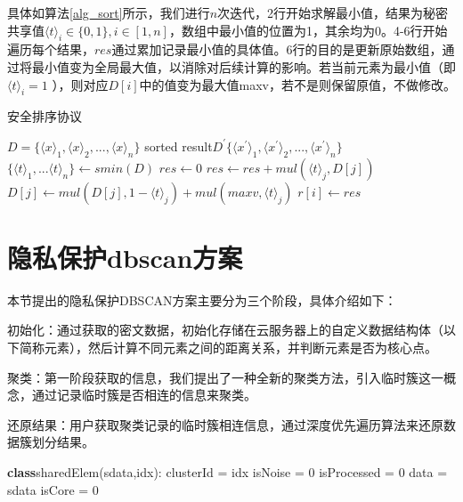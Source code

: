 具体如算法\ref{alg_sort}所示，我们进行$ n $次迭代，2行开始求解最小值，结果为秘密共享值$ \langle t \rangle_i \in \{0,1\}, i\in[1,n] $，数组中最小值的位置为1，其余均为0。4-6行开始遍历每个结果，$ res $通过累加记录最小值的具体值。6行的目的是更新原始数组，通过将最小值变为全局最大值，以消除对后续计算的影响。若当前元素为最小值（即$\langle t \rangle_i=1  $ ），则对应$ D[i] $中的值变为最大值maxv，若不是则保留原值，不做修改。
\begin{algorithm}[htbp]
	\renewcommand{\algorithmicrequire}{\textbf{输入:}}
	\renewcommand{\algorithmicensure}{\textbf{输出:}}
	\caption{安全排序协议}
	\label{alg_sort}
	\begin{algorithmic}[1]
		\REQUIRE $ D = \{\langle x\rangle_1, \langle x\rangle_2,...,\langle x\rangle_n\} $
		\ENSURE sorted result$ D^{\prime}\{\langle x^{\prime}\rangle_1, \langle x^{\prime}\rangle_2,...,\langle x^{\prime}\rangle_n\} $
		\STATE $ \{\langle t\rangle_1,...\langle t \rangle_n\} \leftarrow smin(D)$
		\STATE $ res \leftarrow 0 $
		\STATE $ res \leftarrow res + mul(\langle t \rangle_j, D[j]) $ 
		\STATE $ D[j] \leftarrow mul(D[j],1-\langle t \rangle_j) + mul(maxv, \langle t \rangle_j)$
		\ENDFOR
		\STATE $ r[i] \leftarrow res $
		\ENDFOR
	\end{algorithmic}
\end{algorithm}
\section{隐私保护dbscan方案}
\label{s4-t1}
本节提出的隐私保护DBSCAN方案主要分为三个阶段，具体介绍如下：
\begin{compactitem}
	\item 初始化：通过获取的密文数据，初始化存储在云服务器上的自定义数据结构体（以下简称元素），然后计算不同元素之间的距离关系，并判断元素是否为核心点。
	\item 聚类：第一阶段获取的信息，我们提出了一种全新的聚类方法，引入临时簇这一概念，通过记录临时簇是否相连的信息来聚类。
	\item 还原结果：用户获取聚类记录的临时簇相连信息，通过深度优先遍历算法来还原数据簇划分结果。
\end{compactitem}
\begin{algorithm}
	\begin{algorithmic}[1]
		\STATE \textbf{class}sharedElem(sdata,idx):
		\STATE \hspace{\algorithmicindent} clusterId = idx
		\STATE isNoise = 0
		\STATE isProcessed = 0
		\STATE data = sdata
		\STATE isCore = 0
				
	\end{algorithmic}
\end{algorithm}

